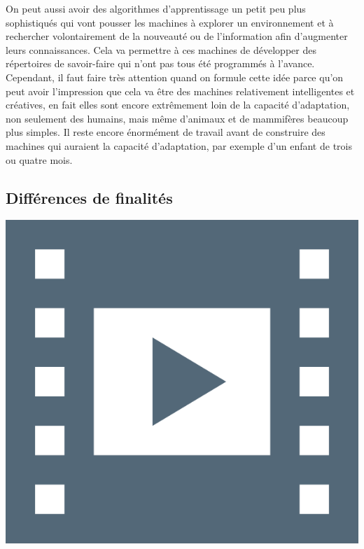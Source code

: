On peut aussi avoir des algorithmes d'apprentissage un petit peu plus sophistiqués qui vont pousser les machines à explorer un environnement et à rechercher volontairement de la nouveauté ou de l'information afin d'augmenter leurs connaissances. Cela va permettre à ces machines de développer des répertoires de savoir-­faire qui n'ont pas tous été programmés à l'avance. Cependant, il faut faire très attention quand on formule cette idée parce qu'on peut avoir l'impression que cela va être des machines relativement intelligentes et créatives, en fait elles sont encore extrêmement loin de la capacité d'adaptation, non seulement des humains, mais même d'animaux et de mammifères beaucoup plus simples. Il reste encore énormément de travail avant de construire des machines qui auraient la capacité d'adaptation, par exemple d'un enfant de trois ou quatre mois.

\vspace{\baselineskip}%

\subsection[Différences de finalités]{Différences de finalités}
\label{sub:III.2.2}

\begin{marginvideo}
	[\label{vid:III.3}Robotique II.]%
	\href{https://www.youtube.com/watch?v=0yK6lKHE7Rk}%
	  {\includegraphics[width=\marginparwidth]{./Images/Pictograms/film-strip-dark-electric-blue.png}}%
\end{marginvideo}

